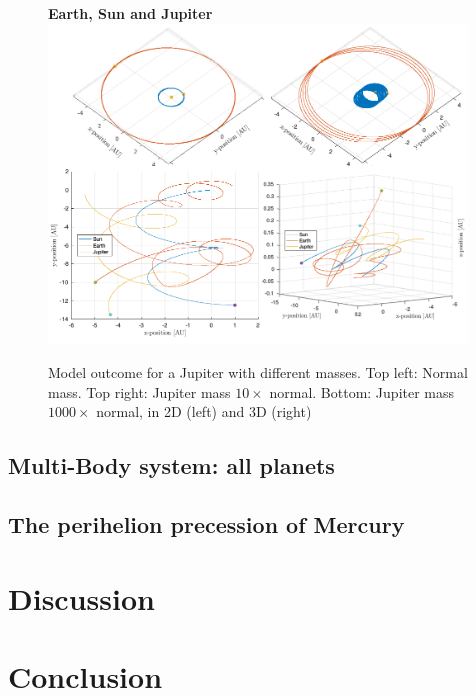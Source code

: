 \documentclass[10pt,a4paper]{amsart}
\begin{document}
\begin{figure}[ht]
	\centering
	\textbf{Earth, Sun and Jupiter}
	\includegraphics[width=0.99\textwidth]{../figures/threebody.png}
	\caption{Model outcome for a Jupiter with different masses. Top left: Normal mass. Top right: Jupiter mass $10\times$ normal. Bottom: Jupiter mass $1000\times$ normal, in 2D (left) and 3D (right)}
\end{figure}

\subsection{Multi-Body system: all planets}

\subsection{The perihelion precession of Mercury}

\section{Discussion}


\section{Conclusion}

\pagebreak
\end{document}

